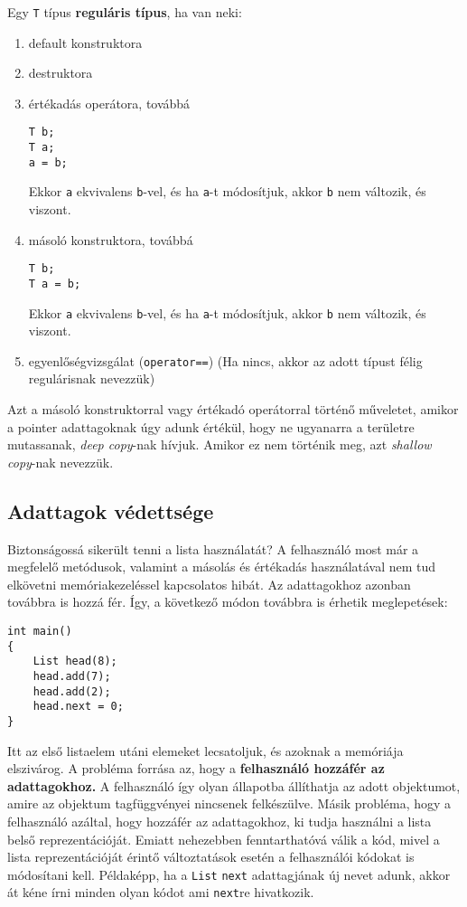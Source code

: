 \documentclass[../cpp_book/cpp_book.tex]{subfiles}
\begin{document}
	Egy \texttt{T} típus \textbf{reguláris típus}, ha van neki:
	\begin{enumerate}
		\item default konstruktora
		\item destruktora
		\item értékadás operátora, továbbá
		\begin{lstlisting}
T b;
T a;
a = b;
		\end{lstlisting}
		Ekkor \texttt{a} ekvivalens \texttt{b}-vel, és ha \texttt{a}-t módosítjuk, akkor \texttt{b} nem változik, és viszont.
		\item másoló konstruktora, továbbá
		\begin{lstlisting}
T b;
T a = b;
		\end{lstlisting}
		Ekkor \texttt{a} ekvivalens \texttt{b}-vel, és ha \texttt{a}-t módosítjuk, akkor \texttt{b} nem változik, és viszont.
		\item egyenlőségvizsgálat (\texttt{operator==}) (Ha nincs, akkor az adott típust félig regulárisnak nevezzük)
	\end{enumerate}
	\begin{note}
		Azt a másoló konstruktorral vagy értékadó operátorral történő műveletet, amikor a pointer adattagoknak úgy adunk értékül, hogy ne ugyanarra a területre mutassanak, \textit{deep copy}-nak hívjuk. Amikor ez nem történik meg, azt \textit{shallow copy}-nak nevezzük.
	\end{note}
	\subsection{Adattagok védettsége}
	Biztonságossá sikerült tenni a lista használatát? A felhasználó most már a megfelelő metódusok, valamint a másolás és értékadás használatával nem tud elkövetni memóriakezeléssel kapcsolatos hibát. Az adattagokhoz azonban továbbra is hozzá fér. Így, a következő módon továbbra is érhetik meglepetések:
	\begin{lstlisting}
int main()
{
	List head(8);
	head.add(7);
	head.add(2);
	head.next = 0;
}
	\end{lstlisting}
	Itt az első listaelem utáni elemeket lecsatoljuk, és azoknak a memóriája elszivárog. A probléma forrása az, hogy a \textbf{felhasználó hozzáfér az adattagokhoz.} A felhasználó így olyan állapotba állíthatja az adott objektumot, amire az objektum tagfüggvényei nincsenek felkészülve. Másik probléma, hogy a felhasználó azáltal, hogy hozzáfér az adattagokhoz, ki tudja használni a lista belső reprezentációját. Emiatt nehezebben fenntarthatóvá válik a kód, mivel a lista reprezentációját érintő változtatások esetén a felhasználói kódokat is módosítani kell. Példaképp, ha a \texttt{List} \texttt{next} adattagjának új nevet adunk, akkor át kéne írni minden olyan kódot ami \texttt{next}re hivatkozik.
	
\end{document}
